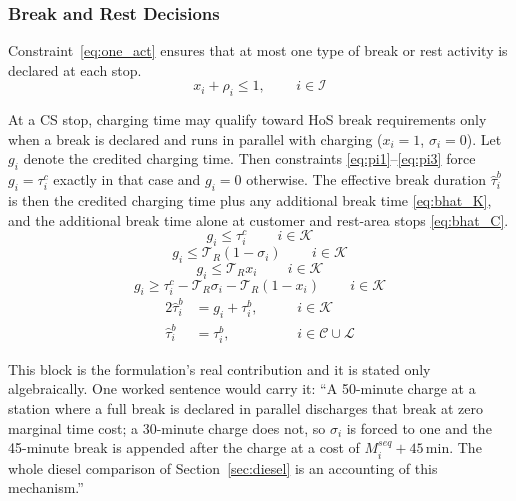 \subsubsection{Break and Rest Decisions}
Constraint~\eqref{eq:one_act} ensures that at most one type of break or rest activity is declared at each stop.
\begin{equation}
    x_i    + \rho_i \leq 1, \qquad \, i \in \mathcal{I} \label{eq:one_act}
\end{equation}

At a CS stop, charging time may qualify toward HoS break requirements only when a break is declared and runs in parallel with charging ($x_i = 1$, $\sigma_i = 0$).
Let $g_i$ denote the credited charging time. Then constraints \eqref{eq:pi1}--\eqref{eq:pi3} force $g_i = \tau_i^c$ exactly in that case and $g_i = 0$ otherwise.
The effective break duration $\hat \tau_i^b$ is then the credited charging time plus any additional break time \eqref{eq:bhat_K}, and the additional break time alone at customer and rest-area stops \eqref{eq:bhat_C}.
\begin{equation}
    g_i \leq \tau_i^c \qquad \, i \in \mathcal{K} \label{eq:pi1}
\end{equation}
\begin{equation}
    g_i \leq \mathcal T_R (1- \sigma_i) \qquad \, i \in \mathcal{K} \label{eq:pi2}
\end{equation}
\begin{equation}
    g_i \leq \mathcal T_R x_i \qquad \, i \in \mathcal{K} \label{eq:pi21}
\end{equation}
\begin{equation}
    g_i \geq \tau_i^c - \mathcal T_R \sigma_i - \mathcal T_R (1-x_i) \qquad \, i \in \mathcal{K} \label{eq:pi3}
\end{equation}
\begin{alignat}{2}
    \hat{\tau}_i^b &= g_i+ \tau_i^b, &\quad& \, i \in \mathcal{K} \label{eq:bhat_K}\\
    \hat{\tau}_i^b &= \tau_i^b,            &\quad& \, i \in \mathcal{C} \cup \mathcal L \label{eq:bhat_C}
\end{alignat}

\begin{anew}
This block is the formulation's real contribution and it is stated only
algebraically. One worked sentence would carry it:
``A 50-minute charge at a station where a full break is declared in parallel
discharges that break at zero marginal time cost; a 30-minute charge does not, so
$\sigma_i$ is forced to one and the 45-minute break is appended after the charge
at a cost of $M^{seq}_i + 45$\,min. The whole diesel comparison of
Section~\ref{sec:diesel} is an accounting of this mechanism.''
\end{anew}

